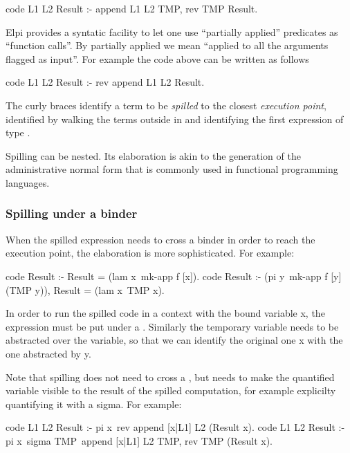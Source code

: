 \documentclass[a4paper, 11pt]{book}
\begin{document}
\begin{elpicode}
code L1 L2 Result :- append L1 L2 TMP, rev TMP Result.
\end{elpicode}

Elpi provides a syntatic facility to let one use
``partially applied'' predicates as ``function calls''.
By partially applied we mean ``applied to all the arguments flagged as input''.
For example the code above can be written as follows

\begin{elpicode}
code L1 L2 Result :- rev {append L1 L2} Result.
\end{elpicode}

The curly braces identify a term to be \emph{spilled} to the closest
\emph{execution point}, identified by walking the terms outside in and
identifying the first expression of type .

Spilling can be nested. Its elaboration is akin to the generation
of the administrative normal form that is commonly used in functional
programming languages.

\subsubsection{Spilling under a binder}

When the spilled expression needs to cross a binder in order to
reach the execution point, the elaboration is more sophisticated.
For example: 

\begin{elpicode}
code Result :- Result = (lam x\ {mk-app f [x]}).
code Result :- (pi y\ mk-app f [y] (TMP y)), Result = (lam x\ TMP x).
\end{elpicode}
  

In order to run the spilled code in a context with the bound variable
x, the expression must be put under a . Similarly
the temporary variable needs to be abstracted over the variable, so
that we can identify the original one x with the one abstracted by
 y.

Note that spilling does not need to cross a , but
needs to make the quantified variable visible to the result of
the spilled computation, for example explicilty quantifying it
with a sigma. For example:

\begin{elpicode}
  code L1 L2 Result :- pi x\ rev {append [x|L1] L2} (Result x).
  code L1 L2 Result :- pi x\ sigma TMP\ append [x|L1] L2 TMP, rev TMP (Result x).
\end{elpicode}
\end{document}
